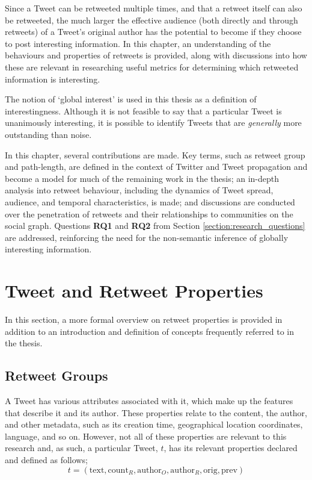 Since a Tweet can be retweeted multiple times, and that a retweet itself can also be retweeted, the much larger the effective audience (both directly and through retweets) of a Tweet's original author has the potential to become if they choose to post interesting information. In this chapter, an understanding of the behaviours and properties of retweets is provided, along with discussions into how these are relevant in researching useful metrics for determining which retweeted information is interesting.

The notion of `global interest' is used in this thesis as a definition of interestingness. Although it is not feasible to say that a particular Tweet is unanimously interesting, it is possible to identify Tweets that are \textit{generally} more outstanding than noise. 

In this chapter, several contributions are made. Key terms, such as retweet group and path-length, are defined in the context of Twitter and Tweet propagation and become a model for much of the remaining work in the thesis; an in-depth analysis into retweet behaviour, including the dynamics of Tweet spread, audience, and temporal characteristics, is made; and discussions are conducted over the penetration of retweets and their relationships to communities on the social graph. Questions \textbf{RQ1} and \textbf{RQ2} from Section \ref{section:research_questions} are addressed, reinforcing the need for the non-semantic inference of globally interesting information.


\section{Tweet and Retweet Properties}
In this section, a more formal overview on retweet properties is provided in addition to an introduction and definition of concepts frequently referred to in the thesis.

\subsection{Retweet Groups}
A Tweet has various attributes associated with it, which make up the features that describe it and its author. These properties relate to the content, the author, and other metadata, such as its creation time, geographical location coordinates, language, and so on. However, not all of these properties are relevant to this research and, as such, a particular Tweet, $t$, has its relevant properties declared and defined as follows;
\[
	t = (\mathrm{text}, \mathrm{count}_R, \mathrm{author}_O, \mathrm{author}_R, \mathrm{orig}, \mathrm{prev})
\]

